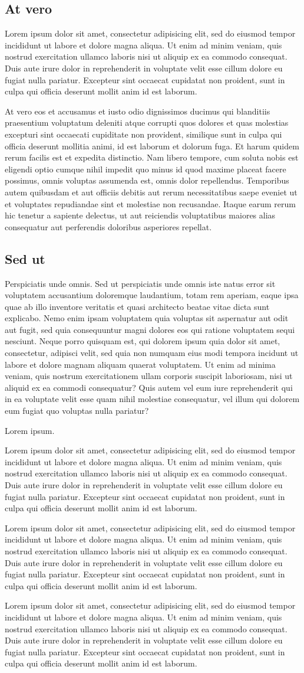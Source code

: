 \documentclass{acmeyaptk}
\def\lorem{Lorem ipsum dolor sit amet, consectetur adipisicing elit, sed
  do eiusmod tempor incididunt ut labore et dolore magna aliqua. Ut enim
  ad minim veniam, quis nostrud exercitation ullamco laboris nisi ut
  aliquip ex ea commodo consequat. Duis aute irure dolor in
  reprehenderit in voluptate velit esse cillum dolore eu fugiat nulla
  pariatur. Excepteur sint occaecat cupidatat non proident, sunt in
  culpa qui officia deserunt mollit anim id est laborum.}
\def\sedut{Sed ut perspiciatis unde omnis iste natus error sit
  voluptatem accusantium doloremque laudantium, totam rem aperiam, eaque
  ipsa quae ab illo inventore veritatis et quasi architecto beatae vitae
  dicta sunt explicabo. Nemo enim ipsam voluptatem quia voluptas sit
  aspernatur aut odit aut fugit, sed quia consequuntur magni dolores eos
  qui ratione voluptatem sequi nesciunt. Neque porro quisquam est, qui
  dolorem ipsum quia dolor sit amet, consectetur, adipisci velit, sed
  quia non numquam eius modi tempora incidunt ut labore et dolore magnam
  aliquam quaerat voluptatem. Ut enim ad minima veniam, quis nostrum
  exercitationem ullam corporis suscipit laboriosam, nisi ut aliquid ex
  ea commodi consequatur? Quis autem vel eum iure reprehenderit qui in
  ea voluptate velit esse quam nihil molestiae consequatur, vel illum
  qui dolorem eum fugiat quo voluptas nulla pariatur?}
\def\atvero{At vero eos et accusamus et iusto odio dignissimos ducimus
  qui blanditiis praesentium voluptatum deleniti atque corrupti quos
  dolores et quas molestias excepturi sint occaecati cupiditate non
  provident, similique sunt in culpa qui officia deserunt mollitia
  animi, id est laborum et dolorum fuga. Et harum quidem rerum facilis
  est et expedita distinctio. Nam libero tempore, cum soluta nobis est
  eligendi optio cumque nihil impedit quo minus id quod maxime placeat
  facere possimus, omnis voluptas assumenda est, omnis dolor
  repellendus. Temporibus autem quibusdam et aut officiis debitis aut
  rerum necessitatibus saepe eveniet ut et voluptates repudiandae sint
  et molestiae non recusandae. Itaque earum rerum hic tenetur a sapiente
  delectus, ut aut reiciendis voluptatibus maiores alias consequatur aut
  perferendis doloribus asperiores
  repellat.}
\begin{document}
\begin{colorframebox}{}
\begin{multicols}{2}
    \columnbreak

    \section{At vero}
    \lorem\par\bigskip
    \atvero
  \end{multicols}

\end{colorframebox}

\begin{minipage}[t]{.4\linewidth}

  \begin{colorframebox}[\textwidth]{}

    \section{Sed ut}

    \group Perspiciatis unde omnis.
    \sedut

    \group Lorem ipsum.
    {\lorem\par\lorem} %

    \lorem
  \end{colorframebox}

\end{minipage}\hfill %
\end{document}
